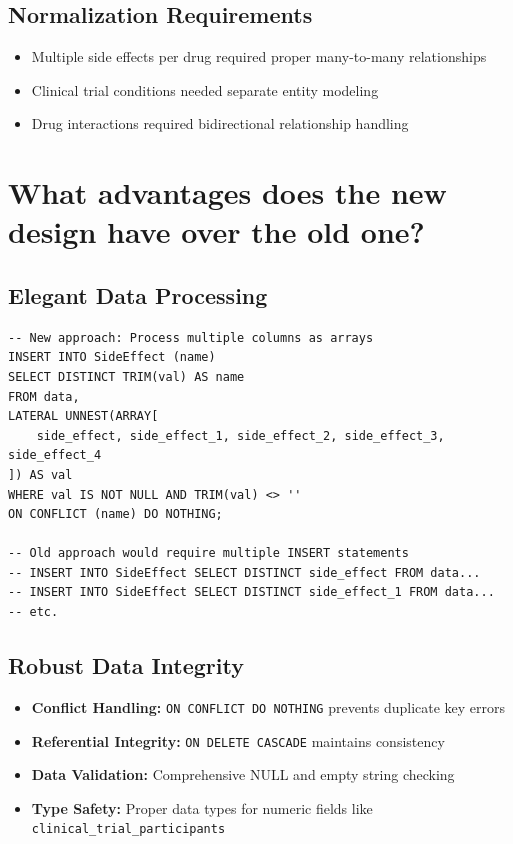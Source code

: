 \documentclass[12pt,a4paper]{article}
\begin{document}
\subsection{Normalization Requirements}
\begin{itemize}
    \item Multiple side effects per drug required proper many-to-many relationships
    \item Clinical trial conditions needed separate entity modeling
    \item Drug interactions required bidirectional relationship handling
\end{itemize}

\section{What advantages does the new design have over the old one?}

\subsection{Elegant Data Processing}
\begin{lstlisting}[style=sqlcode, caption=PostgreSQL Array Processing vs Row-by-Row Approach]
-- New approach: Process multiple columns as arrays
INSERT INTO SideEffect (name)
SELECT DISTINCT TRIM(val) AS name
FROM data,
LATERAL UNNEST(ARRAY[
    side_effect, side_effect_1, side_effect_2, side_effect_3, side_effect_4
]) AS val
WHERE val IS NOT NULL AND TRIM(val) <> ''
ON CONFLICT (name) DO NOTHING;

-- Old approach would require multiple INSERT statements
-- INSERT INTO SideEffect SELECT DISTINCT side_effect FROM data...
-- INSERT INTO SideEffect SELECT DISTINCT side_effect_1 FROM data...
-- etc.
\end{lstlisting}

\subsection{Robust Data Integrity}
\begin{itemize}
    \item \textbf{Conflict Handling:} \texttt{ON CONFLICT DO NOTHING} prevents duplicate key errors
    \item \textbf{Referential Integrity:} \texttt{ON DELETE CASCADE} maintains consistency
    \item \textbf{Data Validation:} Comprehensive NULL and empty string checking
    \item \textbf{Type Safety:} Proper data types for numeric fields like \texttt{clinical\_trial\_participants}
\end{itemize}
\end{document}
